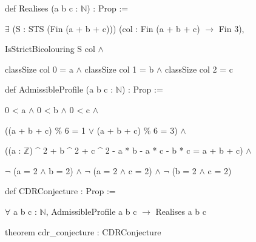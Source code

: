 \documentclass[spanish,11pt,a4paper]{article}
\begin{document}
\begingroup\small\ttfamily\raggedright 
\noindent\hspace*{0.0em}def Realises (a b c : \(\mathbb N\)) : Prop :=\par
\noindent\hspace*{0.9em}\(\exists\) (S : STS (Fin (a + b + c))) (col : Fin (a + b + c) \(\to\) Fin 3),\par
\noindent\hspace*{1.8em}IsStrictBicolouring S col \(\land\)\par
\noindent\hspace*{2.7em}classSize col 0 = a \(\land\) classSize col 1 = b \(\land\) classSize col 2 = c\par
\noindent\hspace*{0.0em}\par
\noindent\hspace*{0.0em}def AdmissibleProfile (a b c : \(\mathbb N\)) : Prop :=\par
\noindent\hspace*{0.9em}0 < a \(\land\) 0 < b \(\land\) 0 < c \(\land\)\par
\noindent\hspace*{0.9em}((a + b + c) \% 6 = 1 \(\lor\) (a + b + c) \% 6 = 3) \(\land\)\par
\noindent\hspace*{0.9em}((a : \(\mathbb Z\)) \textasciicircum{} 2 + b \textasciicircum{} 2 + c \textasciicircum{} 2 - a * b - a * c - b * c = a + b + c) \(\land\)\par
\noindent\hspace*{0.9em}\(\neg\) (a = 2 \(\land\) b = 2) \(\land\) \(\neg\) (a = 2 \(\land\) c = 2) \(\land\) \(\neg\) (b = 2 \(\land\) c = 2)\par
\noindent\hspace*{0.0em}\par
\noindent\hspace*{0.0em}def CDRConjecture : Prop :=\par
\noindent\hspace*{0.9em}\(\forall\) a b c : \(\mathbb N\), AdmissibleProfile a b c \(\to\) Realises a b c\par
\noindent\hspace*{0.0em}\par
\noindent\hspace*{0.0em}theorem cdr\_\allowbreak{}conjecture : CDRConjecture\par
\noindent\hspace*{0.0em}\par
\end{document}

